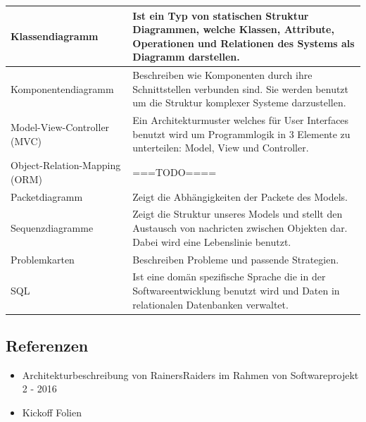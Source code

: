 \documentclass[enabledeprecatedfontcommands,fontsize=12pt,paper=a4,twoside]{scrartcl}
\begin{document}
\begin{longtable}[c]{|p{7cm}|p{8cm}|}
Klassendiagramm                        & Ist ein Typ von statischen Struktur Diagrammen, welche Klassen, Attribute, Operationen und Relationen des Systems als Diagramm darstellen.                                                                              \\ \hline
Komponentendiagramm                    & Beschreiben wie Komponenten durch ihre Schnittstellen verbunden sind. Sie werden benutzt um die Struktur komplexer Systeme darzustellen.                                                                                \\ \hline
Model-View-Controller (MVC)            & Ein Architekturmuster welches für User Interfaces benutzt wird um Programmlogik in 3 Elemente zu unterteilen: Model, View und Controller.                                                                               \\ \hline
Object-Relation-Mapping (ORM)          & ===TODO====                                                                                                                                                                                                             \\ \hline
Packetdiagramm                         & Zeigt die Abhängigkeiten der Packete des Models.                                                                                                                                                                        \\ \hline
Sequenzdiagramme                       & Zeigt die Struktur unseres Models und stellt den Austausch von nachricten zwischen Objekten dar. Dabei wird eine Lebenslinie benutzt.                                                                                   \\ \hline
Problemkarten                          & Beschreiben Probleme und passende Strategien.                                                                                                                                                                           \\ \hline
SQL                                    & Ist eine domän spezifische Sprache die in der Softwareentwicklung benutzt wird und Daten in relationalen Datenbanken verwaltet.                                                                                         \\ \hline
\end{longtable}
\subsection{Referenzen}
\begin{itemize}
  \item Architekturbeschreibung von RainersRaiders im Rahmen von Softwareprojekt 2 - 2016
  \item Kickoff Folien
\end{itemize}
\end{document}
